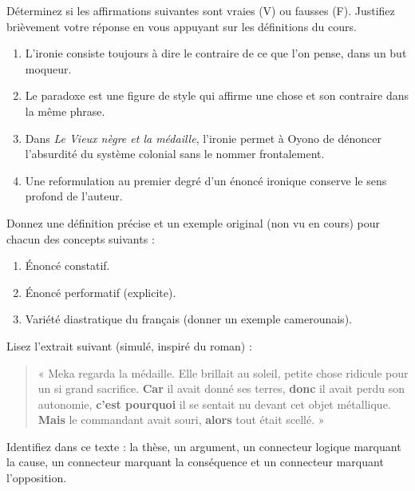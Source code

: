 \documentclass[11pt]{article}
\newcommand{\cle}[1]{{\popxbold\color{popdark}#1}}
\begin{document}
\begin{exercice}
Déterminez si les affirmations suivantes sont vraies (V) ou fausses (F). Justifiez brièvement votre réponse en vous appuyant sur les définitions du cours.
\begin{enumerate}
    \item L'ironie consiste toujours à dire le contraire de ce que l'on pense, dans un but moqueur.
    \item Le paradoxe est une figure de style qui affirme une chose et son contraire dans la même phrase.
    \item Dans \emph{Le Vieux nègre et la médaille}, l'ironie permet à Oyono de dénoncer l'absurdité du système colonial sans le nommer frontalement.
    \item Une reformulation au premier degré d'un énoncé ironique conserve le sens profond de l'auteur.
\end{enumerate}
\end{exercice}

\begin{exercice}
Donnez une définition précise et un exemple original (non vu en cours) pour chacun des concepts suivants :
\begin{enumerate}
    \item Énoncé constatif.
    \item Énoncé performatif (explicite).
    \item Variété diastratique du français (donner un exemple camerounais).
\end{enumerate}
\end{exercice}

\begin{exercice}
Lisez l'extrait suivant (simulé, inspiré du roman) :
\begin{quote}
« Meka regarda la médaille. Elle brillait au soleil, petite chose ridicule pour un si grand sacrifice. \textbf{Car} il avait donné ses terres, \textbf{donc} il avait perdu son autonomie, \textbf{c'est pourquoi} il se sentait nu devant cet objet métallique. \textbf{Mais} le commandant avait souri, \textbf{alors} tout était scellé. »
\end{quote}
Identifiez dans ce texte : la \cle{thèse}, un \cle{argument}, un \cle{connecteur logique} marquant la cause, un \cle{connecteur} marquant la conséquence et un \cle{connecteur} marquant l'opposition.
\end{exercice}
\end{document}
